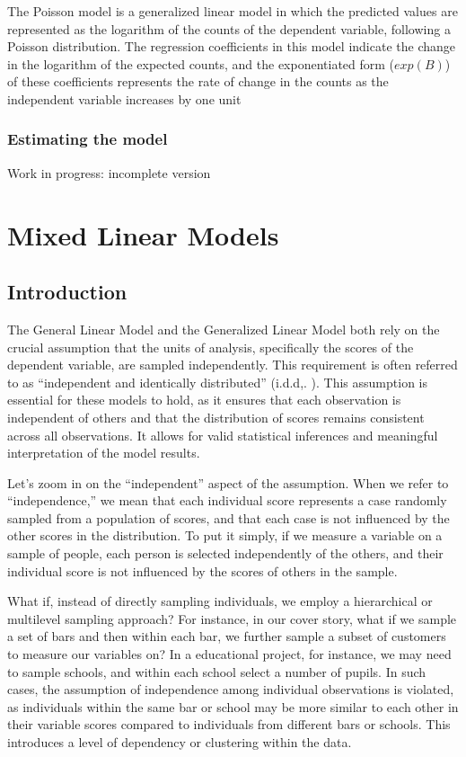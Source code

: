 \documentclass[
]{book}
\begin{document}
The Poisson model is a generalized linear model in which the predicted values are represented as the logarithm of the counts of the dependent variable, following a Poisson distribution. The regression coefficients in this model indicate the change in the logarithm of the expected counts, and the exponentiated form (\(exp(B)\)) of these coefficients represents the rate of change in the counts as the independent variable increases by one unit

\hypertarget{estimating-the-model}{%
\subsection{Estimating the model}\label{estimating-the-model}}

{ Work in progress: incomplete version }

\hypertarget{mixed}{%
\chapter{Mixed Linear Models}\label{mixed}}

\hypertarget{introduction-1}{%
\section{Introduction}\label{introduction-1}}

The General Linear Model and the Generalized Linear Model both rely on the crucial assumption that the units of analysis, specifically the scores of the dependent variable, are sampled independently. This requirement is often referred to as ``independent and identically distributed'' (i.d.d,.
). This assumption is essential for these models to hold, as it ensures that each observation is independent of others and that the distribution of scores remains consistent across all observations. It allows for valid statistical inferences and meaningful interpretation of the model results.

Let's zoom in on the ``independent'' aspect of the assumption. When we refer to ``independence,'' we mean that each individual score represents a case randomly sampled from a population of scores, and that each case is not influenced by the other scores in the distribution. To put it simply, if we measure a variable on a sample of people, each person is selected independently of the others, and their individual score is not influenced by the scores of others in the sample.

What if, instead of directly sampling individuals, we employ a hierarchical or multilevel sampling approach? For instance, in our cover story, what if we sample a set of bars and then within each bar, we further sample a subset of customers to measure our variables on? In a educational project, for instance, we may need to sample schools, and within each school select a number of pupils. In such cases, the assumption of independence among individual observations is violated, as individuals within the same bar or school may be more similar to each other in their variable scores compared to individuals from different bars or schools. This introduces a level of dependency or clustering within the data.
\end{document}
